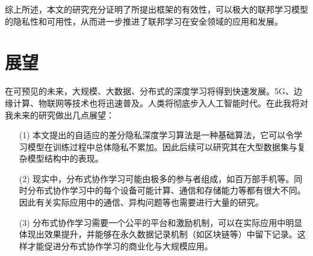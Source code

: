 综上所述，本文的研究充分证明了所提出框架的有效性，可以极大的联邦学习模型的隐私性和可用性，从而进一步推进了联邦学习在安全领域的应用和发展。

\section{展望}
在可预见的未来，大规模、大数据、分布式的深度学习将得到快速发展。5G、边缘计算、物联网等技术也将迅速普及。人类将彻底步入人工智能时代。在此我将对我未来的研究做出几点展望：
\begin{enumerate}
\item [(1)] 本文提出的自适应的差分隐私深度学习算法是一种基础算法，它可以令学习模型在训练过程中总体隐私不累加。因此后续可以研究其在大型数据集与复杂模型结构中的表现。 
\item [(2)] 现实中，分布式协作学习可能由极多的参与者组成，如百万部手机等。同时分布式协作学习中的每个设备可能计算、通信和存储能力等都有很大不同。因此有关实际应用中的通信、异构问题等也需要进行大量的研究。 
\item[(3)] 分布式协作学习需要一个公平的平台和激励机制，可以在实际应用中明显体现出效果提升，并能够在永久数据记录机制（如区块链等）中留下记录。这样才能促进分布式协作学习的商业化与大规模应用。
\end{enumerate}

